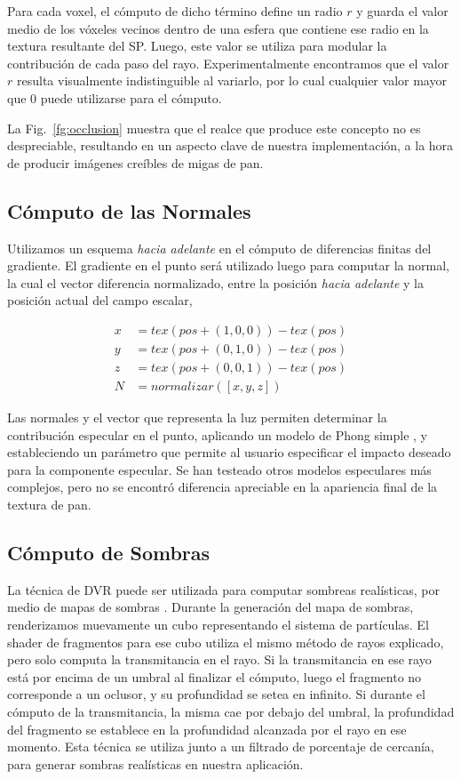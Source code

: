 Para cada voxel, el cómputo de dicho término define un radio $r$ y guarda el valor medio de los vóxeles vecinos dentro de una esfera que contiene ese radio en la textura resultante del SP.
Luego, este valor se utiliza para modular la contribución de cada paso del rayo.
Experimentalmente encontramos que el valor $r$ resulta visualmente indistinguible al variarlo, por lo cual cualquier valor mayor que $0$ puede utilizarse para el cómputo.

La Fig.~\ref{fg:occlusion} muestra que el realce que produce este concepto no es despreciable, resultando en un aspecto clave de nuestra implementación, a la hora de producir imágenes creíbles de migas de pan. 
 
\subsection*{Cómputo de las Normales}
Utilizamos un esquema {\em hacia adelante} en el cómputo de diferencias finitas del gradiente.
El gradiente en el punto será utilizado luego para computar la normal, la cual el vector diferencia normalizado, entre la posición {\em hacia adelante} y la posición actual del campo escalar,


\begin{equation}
\begin{aligned}
x &= tex(pos+(1,0,0)) - tex(pos)\\
y &= tex(pos+(0,1,0)) - tex(pos)\\
z &= tex(pos+(0,0,1)) - tex(pos) \\
N &= normalizar([x,y,z])
\end{aligned}
\end{equation}

Las normales y el vector que representa la luz permiten determinar la contribución especular en el punto, aplicando un modelo de Phong simple \cite{Phong1973}, y estableciendo un parámetro que permite al usuario especificar el impacto deseado para la componente especular.
Se han testeado otros modelos especulares más complejos, pero no se encontró diferencia apreciable en la apariencia final de la textura de pan.

\subsection*{Cómputo de Sombras}
La técnica de DVR puede ser utilizada para computar sombreas realísticas, por medio de mapas de sombras \cite{Williams1978}.
Durante la generación del mapa de sombras, renderizamos muevamente un cubo representando el sistema de partículas.
El shader de fragmentos para ese cubo utiliza el mismo método de rayos explicado, pero solo computa la transmitancia en el rayo.
Si la transmitancia en ese rayo está por encima de un umbral al finalizar el cómputo, luego el fragmento no corresponde a un oclusor, y su profundidad se setea en infinito.
Si durante el cómputo de la transmitancia, la misma cae por debajo del umbral, la profundidad del fragmento se establece en la profundidad alcanzada por el rayo en ese momento.
Esta técnica se utiliza junto a un filtrado de porcentaje de cercanía, para generar sombras realísticas en nuestra aplicación.


